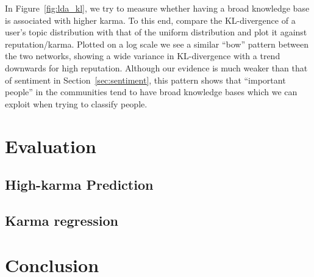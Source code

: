 \documentclass[11pt]{article}
\begin{document}
In Figure~\ref{fig:lda_kl}, we try to measure whether having a broad knowledge
base is associated with higher karma. To this end, compare the KL-divergence of
a user's topic distribution with that of the uniform distribution and plot it
against reputation/karma. Plotted on a log scale we see a similar ``bow''
pattern between the two networks, showing a wide variance in KL-divergence 
with a trend downwards for high reputation. Although our evidence is much weaker
than that of sentiment in Section~\ref{sec:sentiment}, this pattern shows that
``important people'' in the communities tend to have broad knowledge bases which
we can exploit when trying to classify people.

\section{Evaluation}

\subsection{High-karma Prediction}

\subsection{Karma regression}

\section{Conclusion}

{} 
\end{document}
